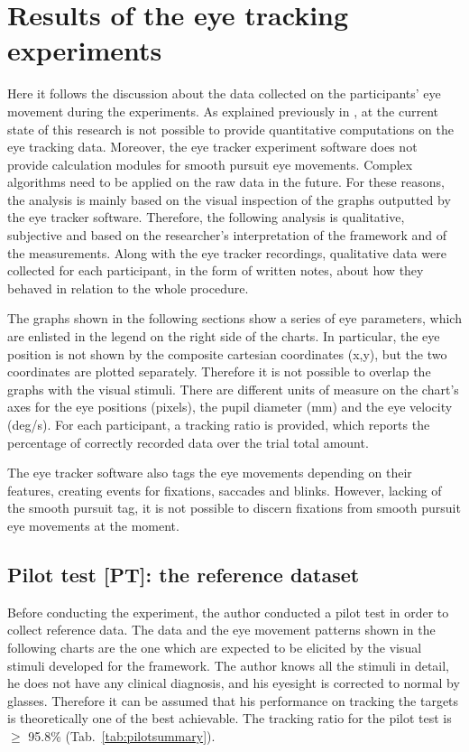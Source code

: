 \chapter{Results of the eye tracking experiments}
\label{chap:results}

Here it follows the discussion about the data collected on the participants’ eye movement during the experiments. As explained previously in , at the current state of this research is not possible to provide quantitative computations on the eye tracking data. Moreover, the eye tracker experiment software does not provide calculation modules for smooth pursuit eye movements. Complex algorithms need to be applied on the raw data in the future. For these reasons, the analysis is mainly based on the visual inspection of the graphs outputted by the eye tracker software. Therefore, the following analysis is qualitative, subjective and based on the researcher’s interpretation of the framework and of the measurements. Along with the eye tracker recordings, qualitative data were collected for each participant, in the form of written notes, about how they behaved in relation to the whole procedure.

The graphs shown in the following sections show a series of eye parameters, which are enlisted in the legend on the right side of the charts. In particular, the eye position is not shown by the composite cartesian coordinates (x,y), but the two coordinates are plotted separately. Therefore it is not possible to overlap the graphs with the visual stimuli. There are different units of measure on the chart’s axes for the eye positions (pixels), the pupil diameter (mm) and the eye velocity (deg/s). For each participant, a tracking ratio is provided, which reports the percentage of correctly recorded data over the trial total amount.

The eye tracker software also tags the eye movements depending on their features, creating events for fixations, saccades and blinks. However, lacking of the smooth pursuit tag, it is not possible to discern fixations from smooth pursuit eye movements at the moment.

\section{Pilot test [PT]: the reference dataset}
\label{sec:respilot}

Before conducting the experiment, the author conducted a pilot test in order to collect reference data. The data and the eye movement patterns shown in the following charts are the one which are expected to be elicited by the visual stimuli developed for the framework.
The author knows all the stimuli in detail, he does not have any clinical diagnosis, and his eyesight is corrected to normal by glasses. Therefore it can be assumed that his performance on tracking the targets is theoretically one of the best achievable. The tracking ratio for the pilot test is \(\geq\) 95.8\% (Tab.~\ref{tab:pilotsummary}).

